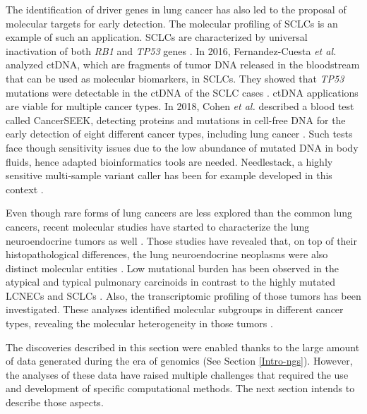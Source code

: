 The identification of driver genes in lung cancer has also led to the proposal of molecular targets for early detection. The molecular profiling of \gls{SCLC}s is an example of such an application. \gls{SCLC}s are characterized by universal inactivation of both \textit{RB1} and \textit{TP53} genes \cite{Peifer2012a,George2015,Fernandez-Cuesta2019}. In 2016, Fernandez-Cuesta \textit{et al.} analyzed \gls{ctDNA}, which are fragments of tumor \gls*{DNA} released in the bloodstream that can be used as molecular biomarkers, in \gls{SCLC}s. They showed that \textit{TP53} mutations were detectable in the \gls{ctDNA} of the \gls{SCLC} cases \cite{Fernandez-cuesta2016}. 
\gls{ctDNA} applications are viable for multiple cancer types. In 2018, Cohen \textit{et al.} described a blood test called CancerSEEK, detecting proteins and mutations in cell-free \gls*{DNA} for the early detection of eight different cancer types, including lung cancer \cite{Cohen2018}. Such tests face though sensitivity issues due to the low abundance of mutated \gls*{DNA} in body fluids, hence adapted bioinformatics tools are needed. Needlestack, a highly sensitive multi-sample variant caller has been for example developed in this context \cite{Delhomme2020}. 

Even though rare forms of lung cancers are less explored than the common lung cancers, recent molecular studies have started to characterize the lung neuroendocrine tumors as well \cite{Fernandez-Cuesta2014,George2018,Rekhtman2016,Simbolo2019}. Those studies have revealed that, on top of their histopathological differences, the lung neuroendocrine neoplasms were also distinct molecular entities \cite{Fernandez-Cuesta2019}. Low mutational burden has been observed in the atypical and typical pulmonary carcinoids in contrast to the highly mutated \gls{LCNEC}s and \gls{SCLC}s \cite{Derks2018}. Also, the transcriptomic profiling of those tumors has been investigated. These analyses identified molecular subgroups in different cancer types, revealing the molecular heterogeneity in those tumors \cite{George2018,Rudin2019}. \newline


The discoveries described in this section were enabled thanks to the large amount of data generated during the era of genomics (See Section \ref{Intro-ngs}). However, the analyses of these data have raised multiple challenges that required the use and development of specific computational methods. The next section intends to describe those aspects. 